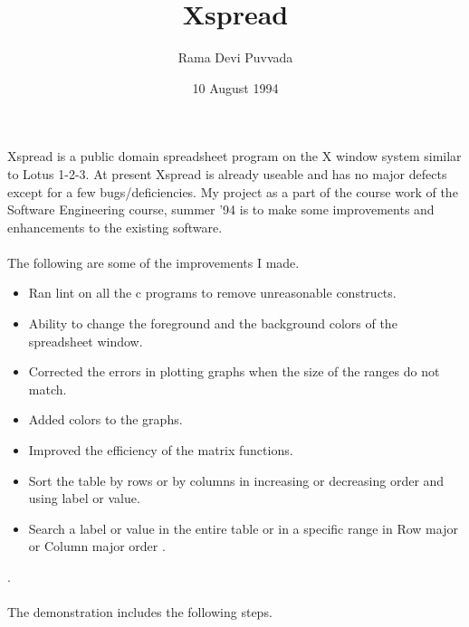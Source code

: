 \title{\bf Xspread}
\author{Rama Devi Puvvada}
\date{10 August 1994}


\maketitle
Xspread is a public domain spreadsheet program on the X window system similar 
to Lotus 1-2-3. At present Xspread is already useable and has no major defects 
except for a few bugs/deficiencies. My project as a part of the course work of 
the Software Engineering course, summer '94 is to make some improvements and 
enhancements to the existing software.
\\
\\
The following are some of the improvements I made.
    \begin{itemize}
     \item Ran lint on all the c programs to remove unreasonable constructs.
     \item Ability to change the foreground and the background colors of the spreadsheet window.
     \item Corrected the errors in plotting graphs when the size of the ranges do not match.
     \item Added colors to the graphs.
     \item Improved the efficiency of the matrix functions. 
     \item Sort the table by rows or by columns in increasing or decreasing order and using label or value.
     \item Search a label or value in the entire table or in a specific range in Row major or Column major order .
    \end{itemize}.
\\
\\
The demonstration includes the following steps.
